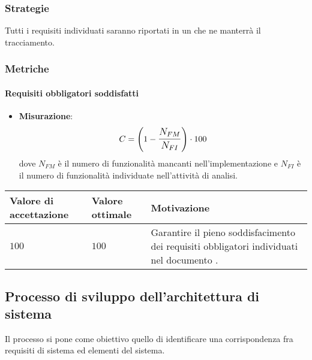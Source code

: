 \subsubsection{Strategie}
Tutti i requisiti individuati saranno riportati in un  che ne manterrà il tracciamento.

\subsubsection{Metriche}
\paragraph{Requisiti obbligatori soddisfatti}

\begin{itemize}
\item \textbf{Misurazione}: 
		$$C=\left(1-\mathlarger{\frac{N_{FM}}{N_{FI}}}\right) \cdot 100$$ 
	dove $N_{FM}$ è il numero di funzionalità mancanti nell'implementazione e $N_{FI}$ è il numero di funzionalità individuate nell'attività di analisi. 
\end{itemize}
	
\begin{center}
	\begin{tabular}{|P{2.5cm}|P{2.5cm}|P{6cm}|}
		\hline
			\textbf{Valore di accettazione}	& \textbf{Valore ottimale} & \textbf{Motivazione} \\
			\hline
			$100$ & $100$ & Garantire il pieno soddisfacimento dei requisiti obbligatori individuati nel documento \AdR. \\
			\hline
			\end{tabular}
\end{center}	

\subsection{Processo di sviluppo dell'architettura di sistema}

Il processo si pone come obiettivo quello di identificare una corrispondenza fra requisiti di sistema ed elementi del sistema.
